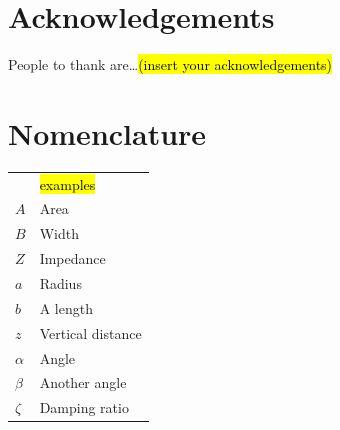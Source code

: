 \chapter{Acknowledgements}

People to thank are\ldots \hl{(insert your acknowledgements)}


\tableofcontents
\listoffigures %
\listoftables %

\chapter{Nomenclature}

\begin{longtable}{ll}
           & \hl{examples}     \\
  $A$      & Area              \\
  $B$      & Width             \\
  $Z$      & Impedance         \\
  $a$      & Radius            \\
  $b$      & A length          \\
  $z$      & Vertical distance \\
  $\alpha$ & Angle             \\
  $\beta$  & Another angle     \\
  $\zeta$  & Damping ratio
\end{longtable}


